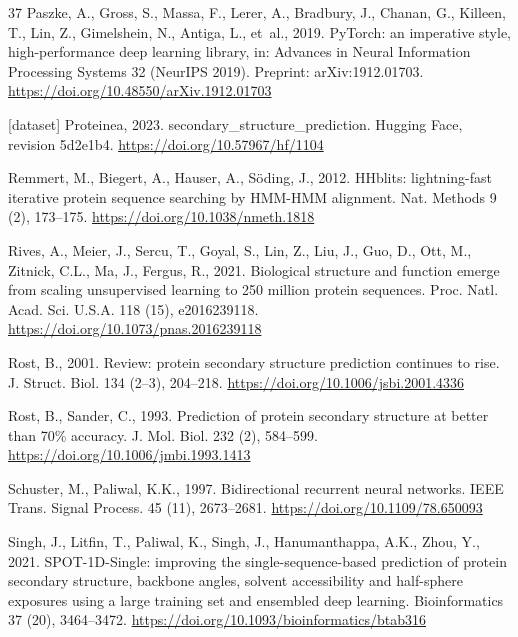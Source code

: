 \documentclass[preprint,12pt,authoryear]{elsarticle}
\begin{document}
\begin{thebibliography}{37}
Paszke, A., Gross, S., Massa, F., Lerer, A., Bradbury, J., Chanan, G., Killeen, T., Lin, Z., Gimelshein, N., Antiga, L., et~al., 2019. PyTorch: an imperative style, high-performance deep learning library, in: Advances in Neural Information Processing Systems 32 (NeurIPS 2019). Preprint: arXiv:1912.01703. \url{https://doi.org/10.48550/arXiv.1912.01703}

[dataset] Proteinea, 2023. secondary\_structure\_prediction. Hugging Face, revision 5d2e1b4. \url{https://doi.org/10.57967/hf/1104}

Remmert, M., Biegert, A., Hauser, A., S{\"o}ding, J., 2012. HHblits: lightning-fast iterative protein sequence searching by HMM-HMM alignment. Nat. Methods 9 (2), 173--175. \url{https://doi.org/10.1038/nmeth.1818}

Rives, A., Meier, J., Sercu, T., Goyal, S., Lin, Z., Liu, J., Guo, D., Ott, M., Zitnick, C.L., Ma, J., Fergus, R., 2021. Biological structure and function emerge from scaling unsupervised learning to 250 million protein sequences. Proc. Natl. Acad. Sci. U.S.A. 118 (15), e2016239118. \url{https://doi.org/10.1073/pnas.2016239118}

Rost, B., 2001. Review: protein secondary structure prediction continues to rise. J. Struct. Biol. 134 (2--3), 204--218. \url{https://doi.org/10.1006/jsbi.2001.4336}

Rost, B., Sander, C., 1993. Prediction of protein secondary structure at better than 70\% accuracy. J. Mol. Biol. 232 (2), 584--599. \url{https://doi.org/10.1006/jmbi.1993.1413}

Schuster, M., Paliwal, K.K., 1997. Bidirectional recurrent neural networks. IEEE Trans. Signal Process. 45 (11), 2673--2681. \url{https://doi.org/10.1109/78.650093}

Singh, J., Litfin, T., Paliwal, K., Singh, J., Hanumanthappa, A.K., Zhou, Y., 2021. SPOT-1D-Single: improving the single-sequence-based prediction of protein secondary structure, backbone angles, solvent accessibility and half-sphere exposures using a large training set and ensembled deep learning. Bioinformatics 37 (20), 3464--3472. \url{https://doi.org/10.1093/bioinformatics/btab316}


\end{thebibliography}
\end{document}
